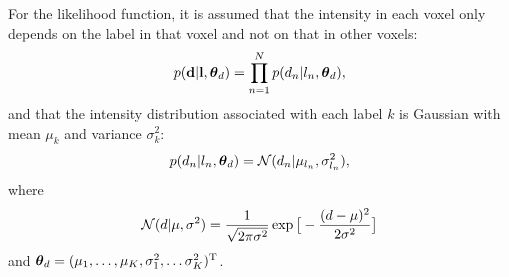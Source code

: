 \documentclass[10pt,twoside]{book}
\begin{document}
For the likelihood function, it is assumed that the intensity in each voxel only depends on the label in that voxel and not on that in other voxels:
\begin{equation}
  p(\mathbf{d} | \mathbf{l}, {\mbox{\boldmath {${\theta}$}}}_d ) = \prod_{n=1}^N p( d_n | l_n, {\mbox{\boldmath {${\theta}$}}}_d ),
  \label{eq:likelihood}
\end{equation}
and that the intensity distribution associated with each label $k$ is Gaussian with mean $\mu_k$ and variance $\sigma_k^2$:
\begin{equation}
  p( d_n | l_n, {\mbox{\boldmath {${\theta}$}}}_d ) = \mathcal N \mathnormal( d_n | \mu_{l_n}, \sigma_{l_n}^2 ),
  \label{eq:Gauss}
\end{equation}
where 
\begin{equation}
  \mathcal N \mathnormal( d | \mu, \sigma^2 ) = \frac{1}{\sqrt{ 2 \pi \sigma^2}} \exp\big[ -\frac{ ( d - \mu )^2}{ 2 \sigma^2} \big] 
\end{equation}
and ${\mbox{\boldmath {${\theta}$}}}_d = ( \mu_1, \ldots, \mu_K, \sigma_1^2, \ldots \sigma_K^2)^\mathrm{T}$.
\end{document}
